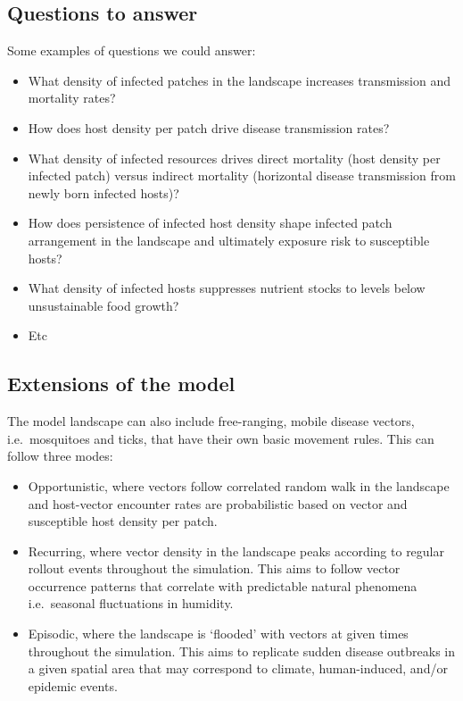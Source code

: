 \documentclass[10,portrait]{article}
\begin{document}
\subsection{Questions to answer}\label{questions-to-answer}

Some examples of questions we could answer:

\begin{itemize}
\item
  What density of infected patches in the landscape increases
  transmission and mortality rates?
\item
  How does host density per patch drive disease transmission rates?
\item
  What density of infected resources drives direct mortality (host
  density per infected patch) versus indirect mortality (horizontal
  disease transmission from newly born infected hosts)?
\item
  How does persistence of infected host density shape infected patch
  arrangement in the landscape and ultimately exposure risk to
  susceptible hosts?
\item
  What density of infected hosts suppresses nutrient stocks to levels
  below unsustainable food growth?
\item
  Etc
\end{itemize}

\subsection{Extensions of the model}\label{extensions-of-the-model}

The model landscape can also include free-ranging, mobile disease
vectors, i.e.~mosquitoes and ticks, that have their own basic movement
rules. This can follow three modes:

\begin{itemize}
\item
  Opportunistic, where vectors follow correlated random walk in the
  landscape and host-vector encounter rates are probabilistic based on
  vector and susceptible host density per patch.
\item
  Recurring, where vector density in the landscape peaks according to
  regular rollout events throughout the simulation. This aims to follow
  vector occurrence patterns that correlate with predictable natural
  phenomena i.e.~seasonal fluctuations in humidity.
\item
  Episodic, where the landscape is `flooded' with vectors at given times
  throughout the simulation. This aims to replicate sudden disease
  outbreaks in a given spatial area that may correspond to climate,
  human-induced, and/or epidemic events.
\end{itemize}
\end{document}
